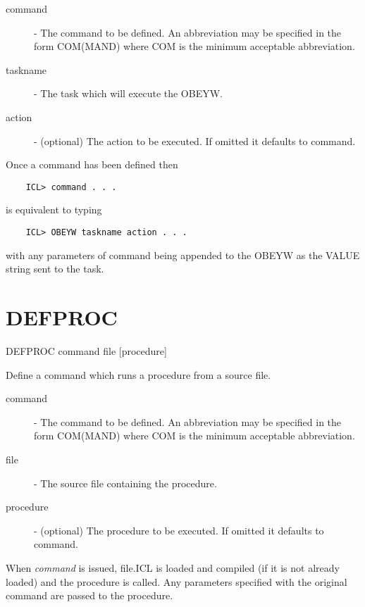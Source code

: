 \begin{description}

\item[command] - The command to be defined. An abbreviation
              may be specified in the form COM(MAND) where
              COM is the minimum acceptable abbreviation.

\item[taskname] - The task which will execute the OBEYW.

\item[action] - (optional)  The action to be executed. If
              omitted it defaults to command.

\end{description}
Once a command has been defined then
\begin{verbatim}
    ICL> command . . .
\end{verbatim}
is equivalent to typing 
\begin{verbatim}
    ICL> OBEYW taskname action . . .
\end{verbatim}
with any parameters of command being appended to the OBEYW as the VALUE
string sent to the task.

\section{DEFPROC}

   DEFPROC \hspace{.5cm} command \hspace{.5cm} file \hspace{.5cm} [procedure]

 Define a command which runs a procedure from a source file.

\begin{description}

\item[command] - The command to be defined. An abbreviation
              may be specified in the form COM(MAND) where
              COM is the minimum acceptable abbreviation.

\item[file]  - The source file containing the procedure.

\item[procedure] - (optional)  The procedure to be executed. If
              omitted it defaults to command.

\end{description}

When {\em command} is issued, file.ICL is loaded and compiled (if it is
not already loaded) and the procedure is called. Any parameters specified
with the original command are passed to the procedure.

